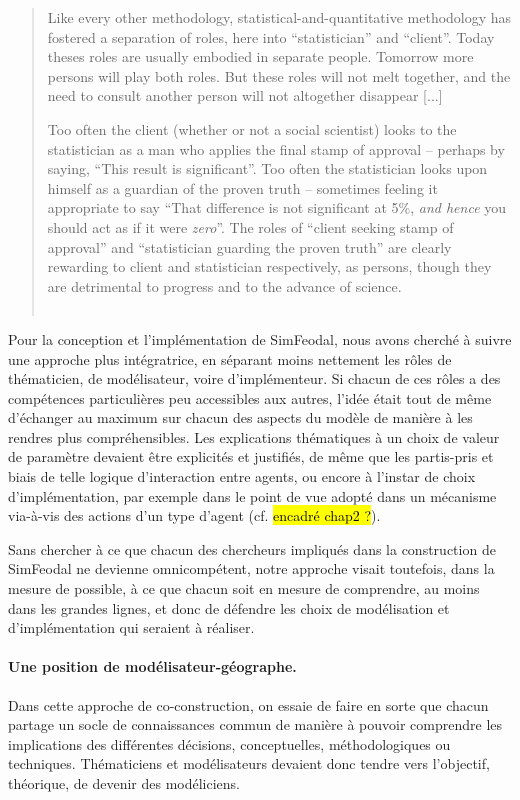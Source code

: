 \begin{quotation}
	\noindent \og Like every other methodology, statistical-and-quantitative methodology has fostered a separation of roles, here into “statistician” and “client”. Today theses roles are usually embodied in separate people. Tomorrow more persons will play both roles. But these roles will not melt together, and the need to consult another person will not altogether disappear [...]
	
	Too often the client (whether or not a social scientist) looks to the statistician as a man who applies the final stamp of approval -- perhaps by saying, “This result is significant”. Too often the statistician looks upon himself as a guardian of the proven truth -- sometimes feeling it appropriate to say “That difference is not significant at 5\%, \textit{and hence} you should act as if it were \textit{zero}”. The roles of “client seeking stamp of approval” and “statistician guarding the proven truth” are clearly rewarding to client and statistician respectively, as persons, though they are detrimental to progress and to the advance of science.\fg{} \\
	\mbox{}~ \hfill \cite[145]{jones_statistical_1986}
\end{quotation}

Pour la conception et l'implémentation de SimFeodal, nous avons cherché à suivre une approche plus intégratrice, en séparant moins nettement les rôles de thématicien, de modélisateur, voire d'\og{}implémenteur\fg{}.
Si chacun de ces rôles a des compétences particulières peu accessibles aux autres, l'idée était tout de même d'échanger au maximum sur chacun des aspects du modèle de manière à les rendres plus compréhensibles.
Les explications thématiques à un choix de valeur de paramètre devaient être explicités et justifiés, de même que les partis-pris et biais de telle logique d'interaction entre agents, ou encore à l'instar de choix d'implémentation, par exemple dans le point de vue adopté dans un mécanisme via-à-vis des actions d'un type d'agent (cf. \hl{encadré chap2 ?}).

Sans chercher à ce que chacun des chercheurs impliqués dans la construction de SimFeodal ne devienne omnicompétent, notre approche visait toutefois, dans la mesure de possible, à ce que chacun soit en mesure de comprendre, au moins dans les grandes lignes, et donc de défendre les choix de modélisation et d'implémentation qui seraient à réaliser.

\paragraph{Une position de \og modélisateur-géographe\fg{}.}
Dans cette approche de co-construction, on essaie de faire en sorte que chacun partage un socle de connaissances commun de manière à pouvoir comprendre les implications des différentes décisions, conceptuelles, méthodologiques ou techniques.
Thématiciens et modélisateurs devaient donc tendre vers l'objectif, théorique, de devenir des \og modéliciens\fg{}.

